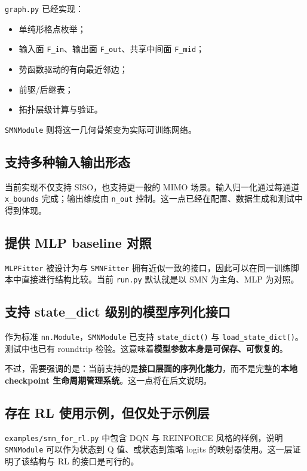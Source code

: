 \documentclass[11pt,fontset=none]{ctexart}
\begin{document}
\texttt{graph.py} 已经实现：
\begin{itemize}[leftmargin=2em]
  \item 单纯形格点枚举；
  \item 输入面 \texttt{F\_in}、输出面 \texttt{F\_out}、共享中间面 \texttt{F\_mid}；
  \item 势函数驱动的有向最近邻边；
  \item 前驱/后继表；
  \item 拓扑层级计算与验证。
\end{itemize}

\texttt{SMNModule} 则将这一几何骨架变为实际可训练网络。

\subsection{支持多种输入输出形态}

当前实现不仅支持 SISO，也支持更一般的 MIMO 场景。输入归一化通过每通道 \texttt{x\_bounds} 完成；输出维度由 \texttt{n\_out} 控制。这一点已经在配置、数据生成和测试中得到体现。

\subsection{提供 MLP baseline 对照}

\texttt{MLPFitter} 被设计为与 \texttt{SMNFitter} 拥有近似一致的接口，因此可以在同一训练脚本中直接进行结构比较。当前 \texttt{run.py} 默认就是以 SMN 为主角、MLP 为对照。

\subsection{支持 state\_dict 级别的模型序列化接口}

作为标准 \texttt{nn.Module}，\texttt{SMNModule} 已支持 \texttt{state\_dict()} 与 \texttt{load\_state\_dict()}。测试中也已有 roundtrip 检验。这意味着\textbf{模型参数本身是可保存、可恢复的}。

不过，需要强调的是：当前支持的是\textbf{接口层面的序列化能力}，而不是完整的\textbf{本地 checkpoint 生命周期管理系统}。这一点将在后文说明。

\subsection{存在 RL 使用示例，但仅处于示例层}

\texttt{examples/smn\_for\_rl.py} 中包含 DQN 与 REINFORCE 风格的样例，说明 \texttt{SMNModule} 可以作为状态到 Q 值、或状态到策略 logits 的映射器使用。这一层证明了该结构与 RL 的接口是可行的。
\end{document}
